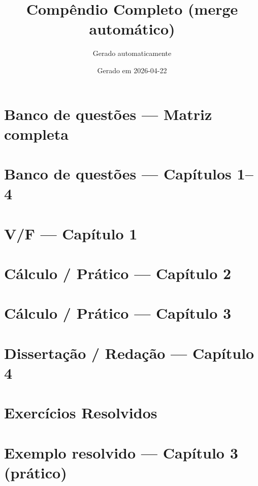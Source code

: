 \documentclass[11pt,a4paper]{article}
\title{Compêndio Completo (merge automático)}
\author{Gerado automaticamente}
\date{Gerado em 2026-04-22}
\begin{document}
\maketitle
\tableofcontents
\clearpage

\section{Banco de questões — Matriz completa}
\clearpage

\section{Banco de questões — Capítulos 1–4}
\clearpage

\section{V/F — Capítulo 1}
\clearpage

\section{Cálculo / Prático — Capítulo 2}
\clearpage

\section{Cálculo / Prático — Capítulo 3}
\clearpage

\section{Dissertação / Redação — Capítulo 4}
\clearpage

\section{Exercícios Resolvidos}
\clearpage

\section{Exemplo resolvido — Capítulo 3 (prático)}
\clearpage
\end{document}
